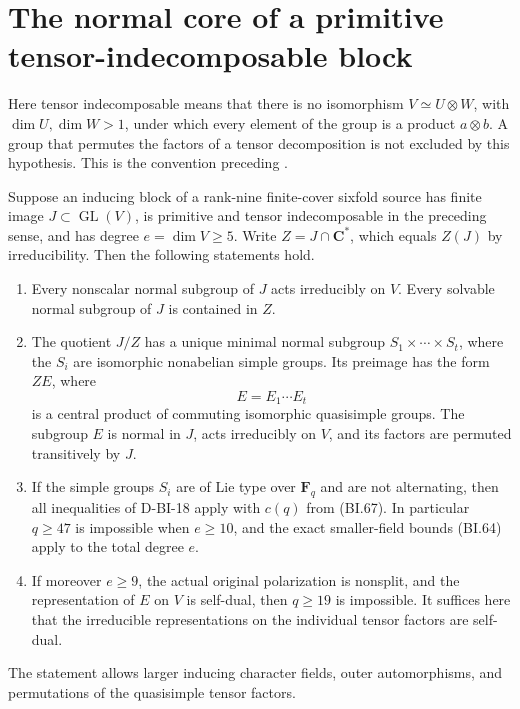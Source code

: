\section{The normal core of a primitive tensor-indecomposable block}
\label{sec:normal-core}

Here tensor indecomposable means that there is no isomorphism
$V\simeq U\otimes W$, with $\dim U,\dim W>1$, under which every
element of the group is a product $a\otimes b$.  A group that
permutes the factors of a tensor decomposition is not excluded by
this hypothesis.  This is the convention preceding
\cite[Theorem~7.1, p.~548]{BI:GS}.

\begin{theorem}
\label{D-BI-19}
Suppose an inducing block of a rank-nine finite-cover sixfold source
has finite image $J\subset\operatorname{GL}(V)$, is primitive and
tensor indecomposable in the preceding sense, and has degree
$e=\dim V\ge5$.  Write $Z=J\cap\mathbf C^*$, which equals
$Z(J)$ by irreducibility.  Then the following statements hold.
\begin{enumerate}
\item Every nonscalar normal subgroup of $J$ acts irreducibly on
$V$.  Every solvable normal subgroup of $J$ is contained in $Z$.
\item The quotient $J/Z$ has a unique minimal normal subgroup
$S_1\times\cdots\times S_t$, where the $S_i$ are isomorphic
nonabelian simple groups.  Its preimage has the form $ZE$, where
\[
                        E=E_1\cdots E_t                     \tag{BI.69}
\]
is a central product of commuting isomorphic quasisimple groups.
The subgroup $E$ is normal in $J$, acts irreducibly on $V$, and
its factors are permuted transitively by $J$.
\item If the simple groups $S_i$ are of Lie type over
$\mathbf F_q$ and are not alternating, then all inequalities of
D-BI-18 apply with $c(q)$ from (BI.67).  In particular $q\ge47$
is impossible when $e\ge10$, and the exact smaller-field bounds
(BI.64) apply to the total degree $e$.
\item If moreover $e\ge9$, the actual original polarization is
nonsplit, and the representation of $E$ on $V$ is self-dual,
then $q\ge19$ is impossible.  It suffices here that the irreducible
representations on the individual tensor factors are self-dual.
\end{enumerate}
The statement allows larger inducing character fields, outer
automorphisms, and permutations of the quasisimple tensor factors.
\end{theorem}

